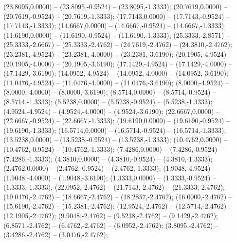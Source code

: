    (23.8095,0.0000) -- (23.8095,-0.9524) -- (23.8095,-1.3333);
   (20.7619,0.0000) -- (20.7619,-0.9524) -- (20.7619,-1.3333);
   (17.7143,0.0000) -- (17.7143,-0.9524) -- (17.7143,-1.3333);
   (14.6667,0.0000) -- (14.6667,-0.9524) -- (14.6667,-1.3333);
   (11.6190,0.0000) -- (11.6190,-0.9524) -- (11.6190,-1.3333);
   (25.3333,-2.8571) -- (25.3333,-2.6667) -- (25.3333,-2.4762) -- (24.7619,-2.4762) -- (24.3810,-2.4762);
   (23.2381,-4.9524) -- (23.2381,-4.0000) -- (23.2381,-3.6190);
   (20.1905,-4.9524) -- (20.1905,-4.0000) -- (20.1905,-3.6190);
   (17.1429,-4.9524) -- (17.1429,-4.0000) -- (17.1429,-3.6190);
   (14.0952,-4.9524) -- (14.0952,-4.0000) -- (14.0952,-3.6190);
   (11.0476,-4.9524) -- (11.0476,-4.0000) -- (11.0476,-3.6190);
   (8.0000,-4.9524) -- (8.0000,-4.0000) -- (8.0000,-3.6190);
   (8.5714,0.0000) -- (8.5714,-0.9524) -- (8.5714,-1.3333);
   (5.5238,0.0000) -- (5.5238,-0.9524) -- (5.5238,-1.3333);
   (4.9524,-4.9524) -- (4.9524,-4.0000) -- (4.9524,-3.6190);
   (22.6667,0.0000) -- (22.6667,-0.9524) -- (22.6667,-1.3333);
   (19.6190,0.0000) -- (19.6190,-0.9524) -- (19.6190,-1.3333);
   (16.5714,0.0000) -- (16.5714,-0.9524) -- (16.5714,-1.3333);
   (13.5238,0.0000) -- (13.5238,-0.9524) -- (13.5238,-1.3333);
   (10.4762,0.0000) -- (10.4762,-0.9524) -- (10.4762,-1.3333);
   (7.4286,0.0000) -- (7.4286,-0.9524) -- (7.4286,-1.3333);
   (4.3810,0.0000) -- (4.3810,-0.9524) -- (4.3810,-1.3333);
   (2.4762,0.0000) -- (2.4762,-0.9524) -- (2.4762,-1.3333);
   (1.9048,-4.9524) -- (1.9048,-4.0000) -- (1.9048,-3.6190);
   (1.3333,0.0000) -- (1.3333,-0.9524) -- (1.3333,-1.3333);
   (22.0952,-2.4762) -- (21.7143,-2.4762) -- (21.3333,-2.4762);
   (19.0476,-2.4762) -- (18.6667,-2.4762) -- (18.2857,-2.4762);
   (16.0000,-2.4762) -- (15.6190,-2.4762) -- (15.2381,-2.4762);
   (12.9524,-2.4762) -- (12.5714,-2.4762) -- (12.1905,-2.4762);
   (9.9048,-2.4762) -- (9.5238,-2.4762) -- (9.1429,-2.4762);
   (6.8571,-2.4762) -- (6.4762,-2.4762) -- (6.0952,-2.4762);
   (3.8095,-2.4762) -- (3.4286,-2.4762) -- (3.0476,-2.4762);
